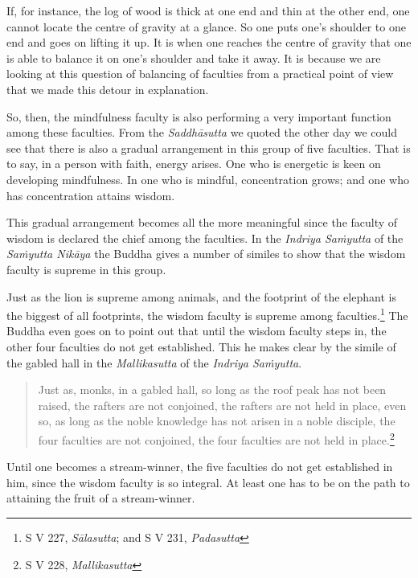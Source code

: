 \enlargethispage{-\baselineskip}

If, for instance, the log of wood is thick at one end and thin at the other end, one cannot locate the centre of gravity at a glance. So one puts one's shoulder to one end and goes on lifting it up. It is when one reaches the centre of gravity that one is able to balance it on one's shoulder and take it away. It is because we are looking at this question of balancing of faculties from a practical point of view that we made this detour in explanation.

So, then, the mindfulness faculty is also performing a very important function among these faculties. From the \emph{Saddhāsutta} we quoted the other day we could see that there is also a gradual arrangement in this group of five faculties. That is to say, in a person with faith, energy arises. One who is energetic is keen on developing mindfulness. In one who is mindful, concentration grows; and one who has concentration attains wisdom.

This gradual arrangement becomes all the more meaningful since the faculty of wisdom is declared the chief among the faculties. In the \emph{Indriya Saṁyutta} of the \emph{Saṁyutta Nikāya} the Buddha gives a number of similes to show that the wisdom faculty is supreme in this group.

Just as the lion is supreme among animals, and the footprint of the elephant is the biggest of all footprints, the wisdom faculty is supreme among faculties.\footnote{S V 227, \emph{Sālasutta}; and S V 231, \emph{Padasutta}} The Buddha even goes on to point out that until the wisdom faculty steps in, the other four faculties do not get established. This he makes clear by the simile of the gabled hall in the \emph{Mallikasutta} of the \emph{Indriya Saṁyutta}.

\begin{quote}
Just as, monks, in a gabled hall, so long as the roof peak has not been raised, the rafters are not conjoined, the rafters are not held in place, even so, as long as the noble knowledge has not arisen in a noble disciple, the four faculties are not conjoined, the four faculties are not held in place.\footnote{S V 228, \emph{Mallikasutta}}
\end{quote}

Until one becomes a stream-winner, the five faculties do not get established in him, since the wisdom faculty is so integral. At least one has to be on the path to attaining the fruit of a stream-winner.


